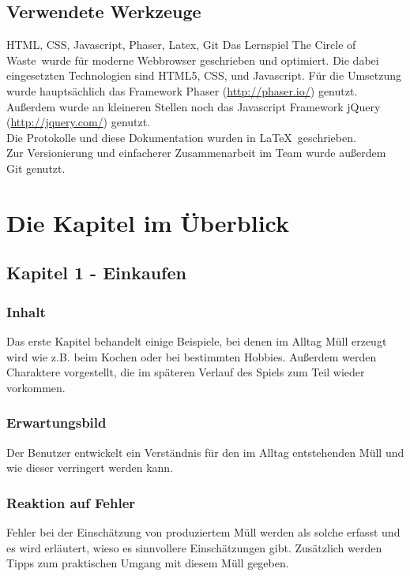 \documentclass[a4paper]{article}
\begin{document}
    \subsection{Verwendete Werkzeuge}
        HTML, CSS, Javascript, Phaser, Latex, Git
        Das Lernspiel \glqq The Circle of Waste\grqq\ wurde für moderne Webbrowser geschrieben und optimiert. Die dabei eingesetzten Technologien sind HTML5, CSS, und Javascript. Für die Umsetzung wurde hauptsächlich das Framework Phaser (\url{http://phaser.io/}) genutzt. Außerdem wurde an kleineren Stellen noch das Javascript Framework jQuery (\url{http://jquery.com/}) genutzt.\\
        Die Protokolle und diese Dokumentation wurden in \LaTeX\ geschrieben.\\
        Zur Versionierung und einfacherer Zusammenarbeit im Team wurde außerdem Git genutzt.

\pagebreak

\section{Die Kapitel im Überblick}
    \subsection{Kapitel 1 - Einkaufen}
        \subsubsection{Inhalt}
            Das erste Kapitel behandelt einige Beispiele, bei denen im Alltag Müll erzeugt wird wie z.B. beim Kochen oder bei bestimmten Hobbies. Außerdem werden Charaktere vorgestellt, die im späteren Verlauf des Spiels zum Teil wieder vorkommen.
        \subsubsection{Erwartungsbild}
            Der Benutzer entwickelt ein Verständnis für den im Alltag entstehenden Müll und wie dieser verringert werden kann.
        \subsubsection{Reaktion auf Fehler}
            Fehler bei der Einschätzung von produziertem Müll werden als solche erfasst und es wird erläutert, wieso es sinnvollere Einschätzungen gibt. Zusätzlich werden Tipps zum praktischen Umgang mit diesem Müll gegeben.
\end{document}
